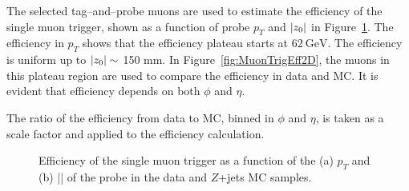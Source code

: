 The selected tag--and--probe muons are used to estimate the efficiency of the single muon trigger, shown as a function of probe $p_{T}$ and $|z_{0}|$ in Figure~\ref{fig:MuonTrigEff1D}. The efficiency in $p_{T}$ shows that the efficiency plateau starts at $62~\si{\GeV}$. The efficiency is uniform up to $|z_{0}|\sim$ 150 mm. In Figure~\ref{fig:MuonTrigEff2D}, the muons in this plateau region are used to compare the efficiency in data and MC. It is evident that efficiency depends on both $\phi$ and $\eta$. 

The ratio of the efficiency from data to MC, binned in $\phi$ and $\eta$, is taken as a scale factor and applied to the efficiency calculation.


\begin{figure}[!htb]
    \centering
    \caption{Efficiency of the single muon trigger as a function of the (a) $p_{T}$ and (b) |\zzero| of the probe in the data and $Z$+jets MC samples.
    }
    \label{fig:MuonTrigEff1D}
\end{figure}


